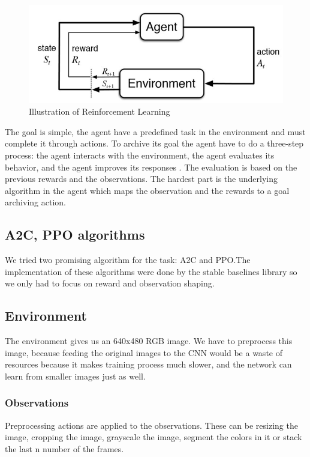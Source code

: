 \documentclass{article}
\begin{document}
\begin{figure}[h!]
	\centering
	\includegraphics[width=0.8\linewidth]{rl.jpg}
	\caption{Illustration of Reinforcement Learning}
	\label{fig:statemachin}
\end{figure}

The goal is simple, the agent have a predefined task in the environment and must complete it through actions. To archive its goal the agent have to do a three-step process: the agent interacts with the environment, the agent evaluates its behavior, and the agent improves its responses \cite{dlr_book}. The evaluation is based on the previous rewards and the observations. The hardest part is the underlying algorithm in the agent which maps the observation and the rewards to a goal archiving action.

\subsection{\normalsize{A2C, PPO algorithms}}

We tried two promising algorithm for the task: A2C and PPO.The implementation of these algorithms were done by the stable baselines library  \cite{stablebase} so we only had to focus on reward and observation shaping.

\subsection{\normalsize{Environment}}

The environment gives us an 640x480 RGB image.
We have to preprocess this image, because feeding the original images to the CNN would be a waste of resources because it makes training process much slower, and the network can learn from smaller images just as well.

\subsubsection{\normalsize{Observations}}

Preprocessing actions are applied to the observations. These can be resizing the image, cropping the image, grayscale the image, segment the colors in it or stack the last n number of the frames.
\end{document}
